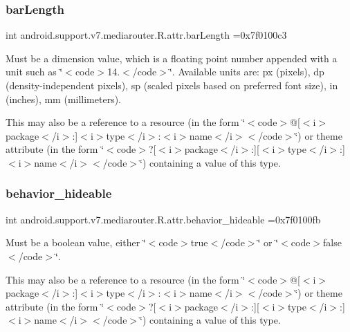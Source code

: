 \subsubsection{\texorpdfstring{bar\+Length}{barLength}}
{\footnotesize\ttfamily int android.\+support.\+v7.\+mediarouter.\+R.\+attr.\+bar\+Length =0x7f0100c3\hspace{0.3cm}{\ttfamily [static]}}

Must be a dimension value, which is a floating point number appended with a unit such as \char`\"{}$<$code$>$14.\+5sp$<$/code$>$\char`\"{}. Available units are\+: px (pixels), dp (density-\/independent pixels), sp (scaled pixels based on preferred font size), in (inches), mm (millimeters). 

This may also be a reference to a resource (in the form \char`\"{}$<$code$>$@\mbox{[}$<$i$>$package$<$/i$>$\+:\mbox{]}$<$i$>$type$<$/i$>$\+:$<$i$>$name$<$/i$>$$<$/code$>$\char`\"{}) or theme attribute (in the form \char`\"{}$<$code$>$?\mbox{[}$<$i$>$package$<$/i$>$\+:\mbox{]}\mbox{[}$<$i$>$type$<$/i$>$\+:\mbox{]}$<$i$>$name$<$/i$>$$<$/code$>$\char`\"{}) containing a value of this type. \mbox{\label{classandroid_1_1support_1_1v7_1_1mediarouter_1_1R_1_1attr_aaa7332b338527a5f334ee93352f0ea50}} 
\subsubsection{\texorpdfstring{behavior\+\_\+hideable}{behavior\_hideable}}
{\footnotesize\ttfamily int android.\+support.\+v7.\+mediarouter.\+R.\+attr.\+behavior\+\_\+hideable =0x7f0100fb\hspace{0.3cm}{\ttfamily [static]}}

Must be a boolean value, either \char`\"{}$<$code$>$true$<$/code$>$\char`\"{} or \char`\"{}$<$code$>$false$<$/code$>$\char`\"{}. 

This may also be a reference to a resource (in the form \char`\"{}$<$code$>$@\mbox{[}$<$i$>$package$<$/i$>$\+:\mbox{]}$<$i$>$type$<$/i$>$\+:$<$i$>$name$<$/i$>$$<$/code$>$\char`\"{}) or theme attribute (in the form \char`\"{}$<$code$>$?\mbox{[}$<$i$>$package$<$/i$>$\+:\mbox{]}\mbox{[}$<$i$>$type$<$/i$>$\+:\mbox{]}$<$i$>$name$<$/i$>$$<$/code$>$\char`\"{}) containing a value of this type. \mbox{\label{classandroid_1_1support_1_1v7_1_1mediarouter_1_1R_1_1attr_a722a2f82701991e158ae91475412028c}} 
